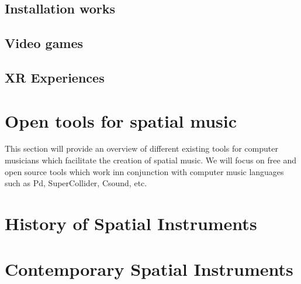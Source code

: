 \subsection{Installation works}

\subsection{Video games}

\subsection{XR Experiences}

\section{Open tools for spatial music}\label{sec:open_tools_spat_mus}

This section will provide an overview of different existing tools for computer musicians which facilitate the creation of spatial music. We will focus on free and open source tools which work inn conjunction with computer music languages such as Pd, SuperCollider, Csound, etc. 

 

\section{History of Spatial Instruments} \label{sec:spat_instruments}
\section{Contemporary Spatial Instruments}

